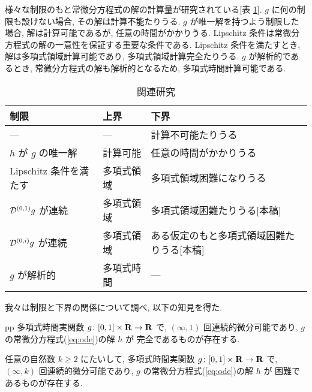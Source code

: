 様々な制限のもと常微分方程式の解の計算量が研究されている[表 \ref{table:related}].
$g$ に何の制限も設けない場合, その解は計算不能たりうる.
$g$ が唯一解を持つよう制限した場合, 解は計算可能であるが, 任意の時間がかかりうる.
Lipschitz 条件は常微分方程式の解の一意性を保証する重要な条件である.
Lipschitz 条件を満たすとき, 解は多項式領域計算可能であり, 多項式領域計算完全たりうる.
$g$ が解析的であるとき, 常微分方程式の解も解析的となるため, 多項式時間計算可能である.

\begin{table}
\renewcommand\arraystretch{1.5}
\begin{center}
 \caption{関連研究}
 \label{table:related}
 \begin{tabular}{llp{}}
  制限 & 上界 & 下界 \\
  \hline
   --- & --- & 計算不可能たりうる \cite{pour1979computable} \\
  $h$ が $g$ の唯一解 & 計算可能 \cite{coddington1955theory}
  & 任意の時間がかかりうる \cite{ko1983computational} \cite{miller1970recursive} \\
  Lipschitz 条件を満たす & 多項式領域 
      &	多項式領域困難になりうる \cite{kawamura2010lipschitz}\\
  $\mathcal D^{(0,1)}g$ が連続 & 多項式領域 & 多項式領域困難たりうる[本稿] \\
  $\mathcal D^{(0,i)}g$ が連続 & 多項式領域 & ある仮定のもと多項式領域困難たりうる[本稿] \\
  $g$ が解析的 
  & 多項式時間 \cite{ko1988computing} \cite{kawamura2010complexity} 
  & ---
 \end{tabular}
\end{center}
\end{table}

我々は制限と下界の関係について調べ, 以下の知見を得た.

 \begin{theorem}
pp  \label{DifferentiableIsPspace}
  多項式時間実関数 $g \colon [0,1] \times \mathbf R \to \mathbf R$ で,
  $(\infty, 1)$ 回連続的微分可能であり,
  $g$ の常微分方程式(\ref{eq:ode})の解 $h$ が \PSPACE 完全であるものが存在する.
 \end{theorem}

 \begin{theorem}
  \label{KTimesIsPspace}
  任意の自然数 $k \ge 2$ にたいして, 
  多項式時間実関数 $g \colon [0,1] \times \mathbf R \to \mathbf R$ で, 
  $(\infty, k)$ 回連続的微分可能であり,
  $g$ の常微分方程式(\ref{eq:ode})の解 $h$ が \DIVPlog 困難であるものが存在する.
 \end{theorem}

